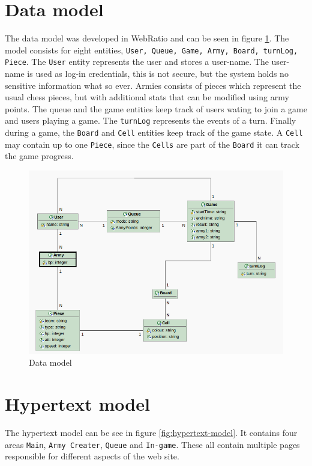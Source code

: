\documentclass{article}
\begin{document}
\section{Data model}
The data model was developed in WebRatio and can be seen in figure \ref{fig:data-model}. The model consists for eight entities, \texttt{User, Queue, Game, Army, Board, turnLog, Piece}. The \texttt{User} entity represents the user and stores a user-name. The user-name is used as log-in credentials, this is not secure, but the system holds no sensitive information what so ever. Armies consists of pieces which represent the usual chess pieces, but with additional stats that can be modified using army points. The queue and the game entities keep track of users wating to join a game and users playing a game. The \texttt{turnLog} represents the events of a turn. Finally during a game, the \texttt{Board} and \texttt{Cell} entities keep track of the game state. A \texttt{Cell} may contain up to one \texttt{Piece}, since the \texttt{Cells} are part of the \texttt{Board} it can track the game progress.
\begin{figure}[H]
    \centering
    \includegraphics[width=\textwidth]{data-model.png}
    \caption{Data model}
    \label{fig:data-model}
\end{figure}

\section{Hypertext model}
The hypertext model can be see in figure \ref{fig:hypertext-model}. It contains four areas \texttt{Main}, \texttt{Army Creater}, \texttt{Queue} and \texttt{In-game}. These all contain multiple pages responsible for different aspects of the web site.
\end{document}
